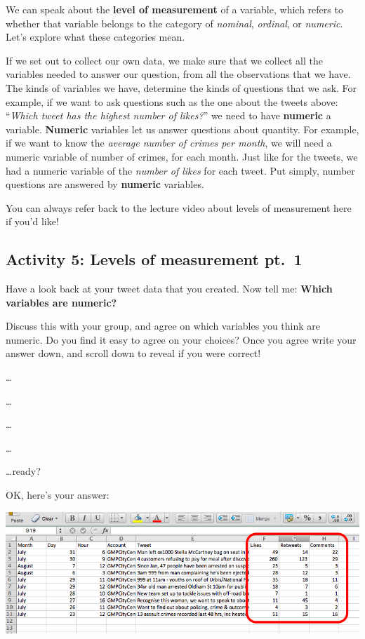 \documentclass[
]{book}
\begin{document}
We can speak about the \textbf{level of measurement} of a variable, which refers to whether that variable belongs to the category of \emph{nominal}, \emph{ordinal}, or \emph{numeric}. Let's explore what these categories mean.

If we set out to collect our own data, we make sure that we collect all the variables needed to answer our question, from all the observations that we have. The kinds of variables we have, determine the kinds of questions that we ask. For example, if we want to ask questions such as the one about the tweets above: ``\emph{Which tweet has the highest number of likes?}'' we need to have \textbf{numeric} a variable. \textbf{Numeric} variables let us answer questions about quantity. For example, if we want to know the \emph{average number of crimes per month}, we will need a numeric variable of number of crimes, for each month. Just like for the tweets, we had a numeric variable of the \emph{number of likes} for each tweet. Put simply, number questions are answered by \textbf{numeric} variables.

You can always refer back to the lecture video about levels of measurement here if you'd like!

\hypertarget{activity-5-levels-of-measurement-pt.-1}{%
\subsection{Activity 5: Levels of measurement pt.~1}\label{activity-5-levels-of-measurement-pt.-1}}

Have a look back at your tweet data that you created. Now tell me: \textbf{Which variables are numeric?}

Discuss this with your group, and agree on which variables you think are numeric. Do you find it easy to agree on your choices? Once you agree write your answer down, and scroll down to reveal if you were correct!

\ldots{}

\ldots{}

\ldots{}

\ldots{}

\ldots ready?

OK, here's your answer:

\includegraphics{imgs/num_vars.png}
\end{document}
